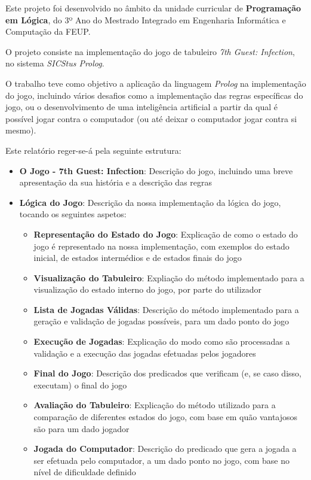 \documentclass[a4paper]{article}
\begin{document}
\bigskip
Este projeto foi desenvolvido no âmbito da unidade curricular de \textbf{Programação em Lógica}, do 3º Ano do Mestrado Integrado em Engenharia Informática e Computação da FEUP.

O projeto consiste na implementação do jogo de tabuleiro \textit{7th Guest: Infection}, no sistema \textit{SICStus Prolog}.

\bigskip
O trabalho teve como objetivo a aplicação da linguagem \textit{Prolog} na implementação do jogo, incluindo vários desafios como a implementação das regras específicas do jogo, ou o desenvolvimento de uma inteligência artificial a partir da qual é possível jogar contra o computador (ou até deixar o computador jogar contra si mesmo).

\bigskip
Este relatório reger-se-á pela seguinte estrutura:

\begin{itemize}
    \item \textbf{O Jogo - 7th Guest: Infection}: Descrição do jogo, incluindo uma breve apresentação da sua história e a descrição das regras
    \item \textbf{Lógica do Jogo}: Descrição da nossa implementação da lógica do jogo, tocando os seguintes aspetos:
    \begin{itemize}
        \item \textbf{Representação do Estado do Jogo}: Explicação de como o estado do jogo é representado na nossa implementação, com exemplos do estado inicial, de estados intermédios e de estados finais do jogo
        \item \textbf{Visualização do Tabuleiro}: Expliação do método implementado para a visualização do estado interno do jogo, por parte do utilizador
        \item \textbf{Lista de Jogadas Válidas}: Descrição do método implementado para a geração e validação de jogadas possíveis, para um dado ponto do jogo
        \item \textbf{Execução de Jogadas}: Explicação do modo como são processadas a validação e a execução das jogadas efetuadas pelos jogadores
        \item \textbf{Final do Jogo}: Descrição dos predicados que verificam (e, se caso disso, executam) o final do jogo
        \item \textbf{Avaliação do Tabuleiro}: Explicação do método utilizado para a comparação de diferentes estados do jogo, com base em quão vantajosos são para um dado jogador
        \item \textbf{Jogada do Computador}: Descrição do predicado que gera a jogada a ser efetuada pelo computador, a um dado ponto no jogo, com base no nível de dificuldade definido
    \end{itemize}
\end{itemize}
\end{document}
